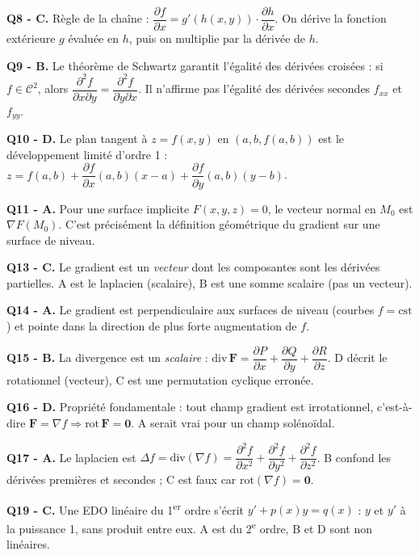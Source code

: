 \documentclass[11pt,a4paper]{article}
\begin{document}
\smallskip
\noindent\textbf{Q8 - C.} Règle de la chaîne : $\dfrac{\partial f}{\partial x} = g'(h(x,y))\cdot\dfrac{\partial h}{\partial x}$. On dérive la fonction extérieure $g$ évaluée en $h$, puis on multiplie par la dérivée de $h$.

\smallskip
\noindent\textbf{Q9 - B.} Le théorème de Schwartz garantit l'égalité des dérivées croisées : si $f\in\mathcal{C}^2$, alors $\dfrac{\partial^2 f}{\partial x\partial y} = \dfrac{\partial^2 f}{\partial y\partial x}$. Il n'affirme pas l'égalité des dérivées secondes $f_{xx}$ et $f_{yy}$.

\smallskip
\noindent\textbf{Q10 - D.} Le plan tangent à $z=f(x,y)$ en $(a,b,f(a,b))$ est le développement limité d'ordre 1 : $z = f(a,b) + \dfrac{\partial f}{\partial x}(a,b)(x-a) + \dfrac{\partial f}{\partial y}(a,b)(y-b)$.

\smallskip
\noindent\textbf{Q11 - A.} Pour une surface implicite $F(x,y,z)=0$, le vecteur normal en $M_0$ est $\nabla F(M_0)$. C'est précisément la définition géométrique du gradient sur une surface de niveau.

\smallskip
\noindent\textbf{Q13 - C.} Le gradient est un \emph{vecteur} dont les composantes sont les dérivées partielles. A est le laplacien (scalaire), B est une somme scalaire (pas un vecteur).

\smallskip
\noindent\textbf{Q14 - A.} Le gradient est perpendiculaire aux surfaces de niveau (courbes $f=\mathrm{cst}$) et pointe dans la direction de plus forte augmentation de $f$.

\smallskip
\noindent\textbf{Q15 - B.} La divergence est un \emph{scalaire} : $\text{div}\,\mathbf{F} = \dfrac{\partial P}{\partial x}+\dfrac{\partial Q}{\partial y}+\dfrac{\partial R}{\partial z}$. D décrit le rotationnel (vecteur), C est une permutation cyclique erronée.

\smallskip
\noindent\textbf{Q16 - D.} Propriété fondamentale : tout champ gradient est irrotationnel, c'est-à-dire $\mathbf{F}=\nabla f \Rightarrow \text{rot}\,\mathbf{F}=\mathbf{0}$. A serait vrai pour un champ solénoïdal.

\smallskip
\noindent\textbf{Q17 - A.} Le laplacien est $\Delta f = \text{div}(\nabla f) = \dfrac{\partial^2 f}{\partial x^2} + \dfrac{\partial^2 f}{\partial y^2} + \dfrac{\partial^2 f}{\partial z^2}$. B confond les dérivées premières et secondes ; C est faux car $\text{rot}(\nabla f) = \mathbf{0}$.

\smallskip
\noindent\textbf{Q19 - C.} Une EDO linéaire du 1\textsuperscript{er} ordre s'écrit $y' + p(x)y = q(x)$ : $y$ et $y'$ à la puissance 1, sans produit entre eux. A est du 2\textsuperscript{e} ordre, B et D sont non linéaires.
\end{document}
